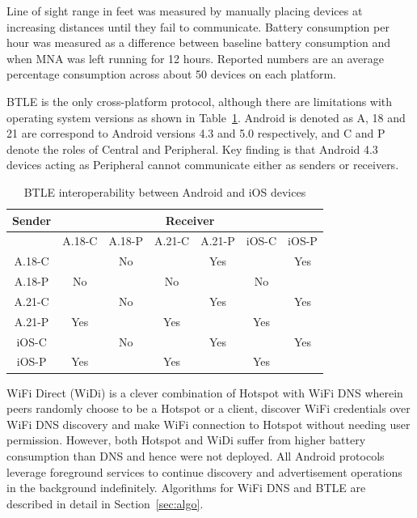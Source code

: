 \documentclass[conference]{IEEEtran}
\begin{document}
Line of sight range in feet was measured by manually placing devices
at increasing distances until they fail to communicate. Battery
consumption per hour was measured as a difference between baseline
battery consumption and when MNA was left running for 12
hours. Reported numbers are an average percentage consumption across
about 50 devices on each platform.

BTLE is the only cross-platform protocol, although there are
limitations with operating system versions as shown in
Table~\ref{tab:android_ios}. Android is denoted as A, 18 and 21 are
correspond to Android versions 4.3 and 5.0 respectively, and C and P
denote the roles of Central and Peripheral. Key finding is that
Android 4.3 devices acting as Peripheral cannot communicate either as
senders or receivers.
%
\begin{table}[H]
\caption{BTLE interoperability between Android and iOS devices}
\label{tab:android_ios}
\centering
\begin{tabular}{|c|c|c|c|c|c|c|}
\hline 
\multicolumn{1}{|c|}{Sender} & \multicolumn{6}{c|}{Receiver} \\
\hline
\multicolumn{1}{|c|}{} & A.18-C & A.18-P & A.21-C & A.21-P  & iOS-C & iOS-P \\
\hline
A.18-C & \cellcolor{Gray}         &   No       & \cellcolor{Gray}         &    Yes       &  \cellcolor{Gray}       &   Yes      \\ 
\hline
A.18-P &  No        & \cellcolor{Gray}         &   No       &  \cellcolor{Gray}         &   No      &  \cellcolor{Gray}       \\ 
\hline
A.21-C & \cellcolor{Gray}         &   No       &  \cellcolor{Gray}        &    Yes       &  \cellcolor{Gray}       &   Yes      \\ 
\hline
A.21-P &  Yes        & \cellcolor{Gray}         &   Yes       &  \cellcolor{Gray}         &   Yes      & \cellcolor{Gray}        \\ 
\hline
iOS-C & \cellcolor{Gray}         &    No      &  \cellcolor{Gray}        &     Yes       & \cellcolor{Gray}        &   Yes      \\ 
\hline
iOS-P &   Yes       & \cellcolor{Gray}         &    Yes      &  \cellcolor{Gray}         &   Yes      &  \cellcolor{Gray}       \\ 
\hline
\end{tabular}
\end{table}
%

WiFi Direct (WiDi) is a clever combination of Hotspot with WiFi DNS
wherein peers randomly choose to be a Hotspot or a client, discover
WiFi credentials over WiFi DNS discovery and make WiFi connection to
Hotspot without needing user permission.  However, both Hotspot and
WiDi suffer from higher battery consumption than DNS and hence were
not deployed. All Android protocols leverage foreground services to
continue discovery and advertisement operations in the background
indefinitely. Algorithms for WiFi DNS and BTLE are described in detail
in Section~\ref{sec:algo}.
\end{document}
